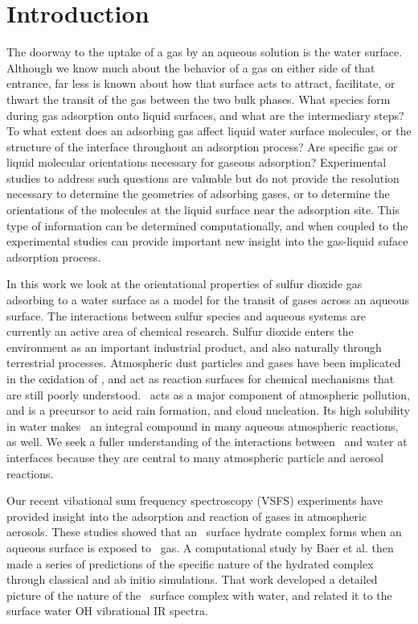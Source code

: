\section{Introduction}

The doorway to the uptake of a gas by an aqueous solution is the water surface. Although we know much about the behavior of a gas on either side of that entrance, far less is known about how that surface acts to attract, facilitate, or thwart the transit of the gas between the two bulk phases. What species form during gas adsorption onto liquid surfaces, and what are the intermediary steps?  To what extent does an adsorbing gas affect liquid water surface molecules, or the structure of the interface throughout an adsorption process?  Are specific gas or liquid molecular orientations necessary for gaseous adsorption?  Experimental studies to address such questions are valuable but do not provide the resolution necessary to determine the geometries of adsorbing gases, or to determine the orientations of the molecules at the liquid surface near the adsorption site.
This type of information can be determined computationally, and when coupled to the experimental studies can provide important new insight into the gas-liquid suface adsorption process.

In this work we look at the orientational properties of sulfur dioxide gas adsorbing to a water surface as a model for the transit of gases across an aqueous surface.  The interactions between sulfur species and aqueous systems are currently an active area of chemical research. Sulfur dioxide enters the environment as an important industrial product, and also naturally through terrestrial processes. Atmospheric dust particles and gases have been implicated in the oxidation of \suldiox, and act as reaction surfaces for chemical mechanisms that are still poorly understood.\cite{Baltrusaitis2011,Rubasinghege2010,Li2007} \suldiox~acts as a major component of atmospheric pollution, and is a precursor to acid rain formation, and cloud nucleation. Its high solubility in water makes \suldiox~an integral compound in many aqueous atmospheric reactions, as well. We seek a fuller understanding of the interactions between \suldiox~and water at interfaces because they are central to many atmospheric particle and aerosol reactions.

Our recent vibational sum frequency spectroscopy (VSFS) experiments have provided insight into the adsorption and reaction of gases in atmospheric aerosols.\cite{Tarbuck2005,Tarbuck2006} These studies showed that an \suldiox~surface hydrate complex forms when an aqueous surface is exposed to \suldiox~gas. A computational study by Baer et al.\cite{Baer2010} then made a series of predictions of the specific nature of the hydrated complex through classical and ab initio simulations. That work developed a detailed picture of the nature of the \suldiox~surface complex with water, and related it to the surface water OH vibrational IR spectra.

